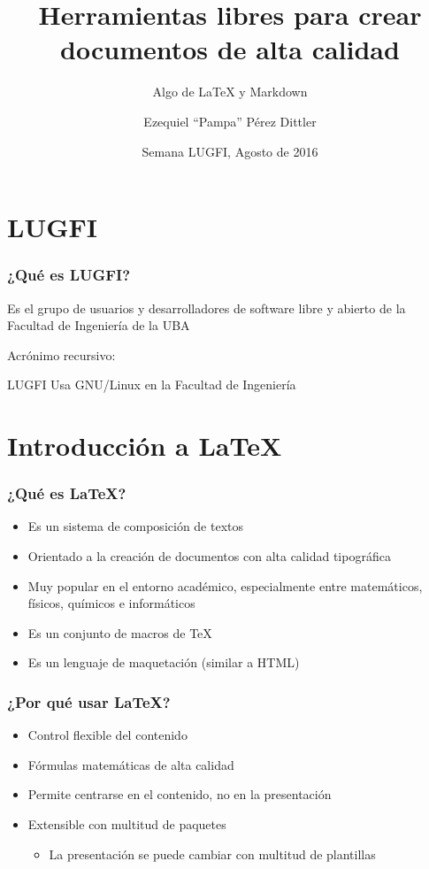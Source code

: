 \documentclass[svgnames]{beamer}
\title{Herramientas libres para crear documentos de alta calidad}
\subtitle{Algo de {\LaTeX} y Markdown}
\author{Ezequiel ``Pampa'' Pérez Dittler}
\date{Semana LUGFI, Agosto de 2016}
\begin{document}
\frame{\titlepage}

\section{LUGFI}

\begin{frame}
  \frametitle{¿Qué es LUGFI?}

  Es el grupo de usuarios y desarrolladores de software libre y abierto de la Facultad de Ingeniería de la UBA

  Acrónimo recursivo:

  LUGFI Usa GNU/Linux en la Facultad de Ingeniería
\end{frame}

\section{Introducción a \LaTeX}

\begin{frame}
  \frametitle{¿Qué es \LaTeX?}
  \begin{itemize}
    \item Es un sistema de composición de textos
    \item Orientado a la creación de documentos con alta calidad tipográfica
    \item Muy popular en el entorno académico, especialmente entre matemáticos, físicos, químicos e informáticos
    \item Es un conjunto de macros de \TeX
    \item Es un lenguaje de maquetación (similar a HTML)
  \end{itemize}
\end{frame}

\begin{frame}
  \frametitle{¿Por qué usar \LaTeX?}
  \begin{itemize}
    \item Control flexible del contenido
    \item Fórmulas matemáticas de alta calidad
    \item Permite centrarse en el contenido, no en la presentación
    \item Extensible con multitud de paquetes
    \begin{itemize}
      \item La presentación se puede cambiar con multitud de plantillas
    \end{itemize}
  \end{itemize}
\end{frame}
\end{document}
